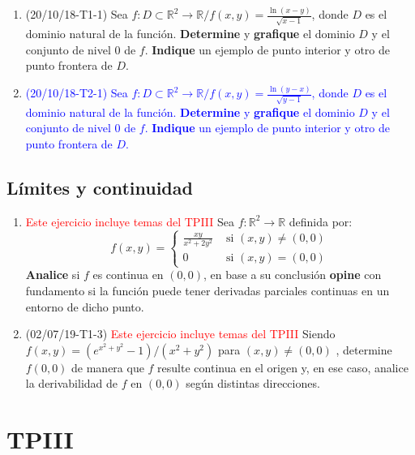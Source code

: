 \documentclass[12pt,a4paper]{article}
\renewcommand{\b}[1]{\textbf{#1}}
\newcommand{\red}[1]{\textcolor{red}{#1}}
\newcommand{\blue}[1]{\textcolor{blue}{#1}}
\newcommand{\R}{\mathbb{R}}
\begin{document}
\begin{enumerate}
	\item (20/10/18-T1-1) Sea $f:D\subset\R^2\rightarrow\R / f(x, y)=\frac{\ln{(x-y)}}{\sqrt{x-1}}$, donde $D$ es el dominio natural de la función. \textbf{Determine} y \textbf{grafique} el dominio $D$ y el conjunto   de nivel $0$ de $f$. \b{Indique} un ejemplo de punto interior y otro de punto frontera de $D$.
	
	\item \blue{(20/10/18-T2-1) Sea $f:D\subset\R^2\rightarrow\R / f(x, y)=\frac{\ln{(y-x)}}{\sqrt{y-1}}$, donde $D$ es el dominio natural de la función. \textbf{Determine} y \textbf{grafique} el dominio $D$ y el conjunto   de nivel $0$ de $f$. \b{Indique} un ejemplo de punto interior y otro de punto frontera de $D$.}
\end{enumerate}

\subsection{Límites y continuidad} \label{cont}
\begin{enumerate}
	\item \red{Este ejercicio incluye temas del TPIII} Sea $f:\R^2 \rightarrow \R$ definida por:
	\[f(x,y)= \begin{cases}
	\frac{xy}{x^2+2y^2} & \text{ si } (x, y)\neq(0,0)\\
	0 & \text{ si } (x, y)=(0,0)
	\end{cases}\]
	\b{Analice} si $f$ es continua en $(0,0)$, en base a su conclusión \b{opine} con fundamento si la función puede tener derivadas parciales continuas en un entorno de dicho punto. \label{ej:cont1}
	
	\item (02/07/19-T1-3) \red{Este ejercicio incluye temas del TPIII} Siendo $ f ( x , y ) = ( e^{x^2 + y^2} - 1 ) /( x^2 + y^2 ) $ para $ ( x , y ) \neq ( 0 , 0 ) $ , determine $ f ( 0 , 0 ) $ de manera que $ f $ resulte continua en el origen y, en ese caso, analice la derivabilidad de $ f $ en $ ( 0 , 0 ) $ según distintas direcciones. \label{ej:cont2}
\end{enumerate}
	
\section{TPIII}
\end{document}
